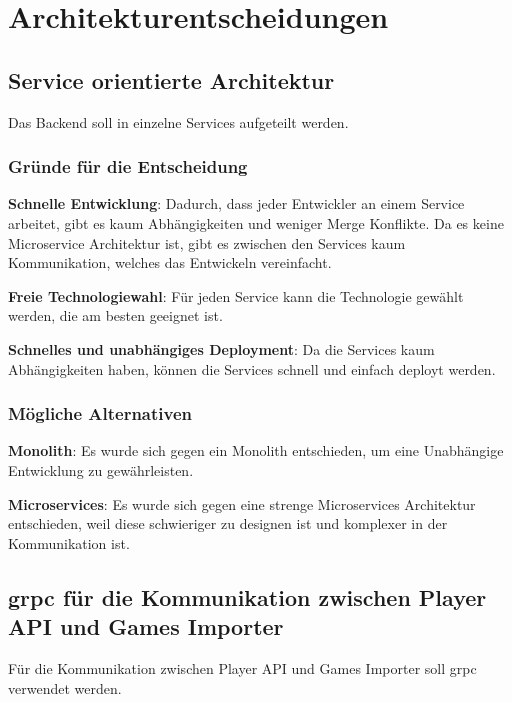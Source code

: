 \section{Architekturentscheidungen}

\subsection{Service orientierte Architektur}\label{subsec:soa}

Das Backend soll in einzelne Services aufgeteilt werden.

\subsubsection{Gründe für die Entscheidung}\label{subsubsec:grunde-fur-die-entscheidung}

\textbf{Schnelle Entwicklung}: Dadurch, dass jeder Entwickler an einem Service arbeitet, gibt es kaum Abhängigkeiten
und weniger Merge Konflikte.
Da es keine Microservice Architektur ist, gibt es zwischen den Services kaum Kommunikation, welches das Entwickeln vereinfacht.

\textbf{Freie Technologiewahl}: Für jeden Service kann die Technologie gewählt werden, die am besten geeignet ist.

\textbf{Schnelles und unabhängiges Deployment}: Da die Services kaum Abhängigkeiten haben, können die Services
schnell und einfach deployt werden.

\subsubsection{Mögliche Alternativen}\label{subsubsec:mogliche-alternativen}

\textbf{Monolith}: Es wurde sich gegen ein Monolith entschieden, um eine Unabhängige Entwicklung zu gewährleisten.

\textbf{Microservices}: Es wurde sich gegen eine strenge Microservices Architektur entschieden, weil diese schwieriger
zu designen ist und komplexer in der Kommunikation ist.


\subsection{grpc für die Kommunikation zwischen Player API und Games Importer}\label{subsec:grpc-fur-die-kommunikation-zwischen-player-api-und-games-importer}

Für die Kommunikation zwischen Player API und Games Importer soll grpc verwendet werden.

